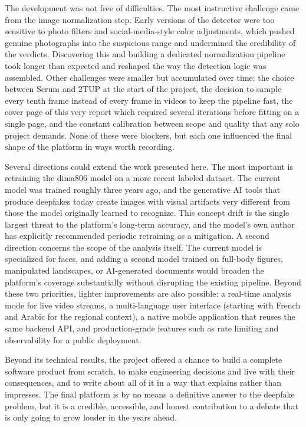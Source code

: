 The development was not free of difficulties. The most instructive challenge came from the image normalization step. Early versions of the detector were too sensitive to photo filters and social-media-style color adjustments, which pushed genuine photographs into the suspicious range and undermined the credibility of the verdicts. Discovering this and building a dedicated normalization pipeline took longer than expected and reshaped the way the detection logic was assembled. Other challenges were smaller but accumulated over time: the choice between Scrum and 2TUP at the start of the project, the decision to sample every tenth frame instead of every frame in videos to keep the pipeline fast, the cover page of this very report which required several iterations before fitting on a single page, and the constant calibration between scope and quality that any solo project demands. None of these were blockers, but each one influenced the final shape of the platform in ways worth recording.

Several directions could extend the work presented here. The most important is retraining the dima806 model on a more recent labeled dataset. The current model was trained roughly three years ago, and the generative AI tools that produce deepfakes today create images with visual artifacts very different from those the model originally learned to recognize. This concept drift is the single largest threat to the platform's long-term accuracy, and the model's own author has explicitly recommended periodic retraining as a mitigation. A second direction concerns the scope of the analysis itself. The current model is specialized for faces, and adding a second model trained on full-body figures, manipulated landscapes, or AI-generated documents would broaden the platform's coverage substantially without disrupting the existing pipeline. Beyond these two priorities, lighter improvements are also possible: a real-time analysis mode for live video streams, a multi-language user interface (starting with French and Arabic for the regional context), a native mobile application that reuses the same backend API, and production-grade features such as rate limiting and observability for a public deployment.

Beyond its technical results, the project offered a chance to build a complete software product from scratch, to make engineering decisions and live with their consequences, and to write about all of it in a way that explains rather than impresses. The final platform is by no means a definitive answer to the deepfake problem, but it is a credible, accessible, and honest contribution to a debate that is only going to grow louder in the years ahead.
